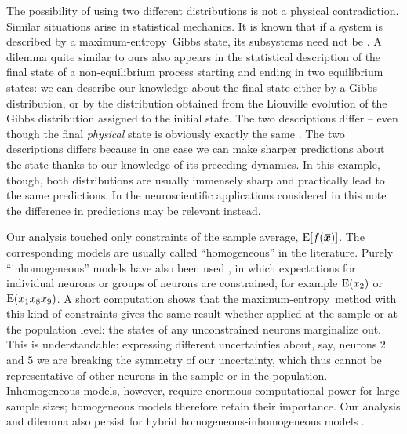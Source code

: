 \documentclass{article}
\theoremstyle{remark}
\theoremstyle{innote}
\newcommand*{\citep}{\parencites}
\renewcommand*{\cite}{\citep}
\renewcommand*{\|}{\mathpunct{|}}%
\DeclarePairedDelimiter\clcl{[}{]}
\newcommand*{\sect}{\S}%
\newcommand*{\E}{\mathrm{E}}
\DeclarePairedDelimiter\expp{(}{)}
\newcommand*{\expe}{\E\expp}%
\newcommand*{\expeb}{\E\clcl}%
\theoremstyle{simple}
\newcommand*{\puzzle}{{\fontencoding{U}\fontfamily{fontawesometwo}\selectfont\symbol{225}}}
\newcommand{\mynote}[1]{ {\color{notecolour}\puzzle\ #1}}
\newcommand*{\widebar}[1]{{\mkern1.5mu\skew{2}\overline{\mkern-1.5mu#1\mkern-1.5mu}\mkern 1.5mu}}
\newcommand*{\sav}{\widebar} %
\newcommand*{\yxx}{x}%
\newcommand*{\yx}{\bm{\yxx}}%
\newcommand*{\yxs}{\sav{\yx}}%
\newcommand*{\me}{maximum-entropy}
\begin{document}
The possibility of using two different distributions is not a physical
contradiction. Similar situations arise in statistical mechanics. It is
known that if a system is described by a \me\ Gibbs state, its subsystems
need not be \cite{maesetal1999}. A dilemma quite similar to ours also
appears in the statistical description of the final state of a
non-equilibrium process starting and ending in two equilibrium states: we
can describe our knowledge about the final state either by a Gibbs
distribution, or by the distribution obtained from the Liouville evolution
of the Gibbs distribution assigned to the initial state. The two
descriptions differ -- even though the final \emph{physical} state is
obviously exactly the same \cite[\sect~4]{jaynes1985d_r1993}. The two
descriptions differs because in one case we can make sharper predictions
about the state thanks to our knowledge of its preceding dynamics. In this
example, though, both distributions are usually immensely sharp and
practically lead to the same predictions. In the neuroscientific
applications considered in this note the difference in predictions may be
relevant instead.

Our analysis touched only constraints of the sample average,
$\expeb{f(\yxs)}$. The corresponding models are usually called
\enquote{homogeneous} in the literature. Purely \enquote{inhomogeneous}
models have also been used
\cite{schneidmanetal2006,shlensetal2006,roudietal2009b}, in which
expectations for individual neurons or groups of neurons are constrained,
for example $\expe{x_2}$ or $\expe{x_1x_8x_9}$. A short computation shows
that the \me\ method with this kind of constraints gives the same result
whether applied at the sample or at the population level: the states of any
unconstrained neurons marginalize out. This is understandable: expressing
different uncertainties about, say, neurons $2$ and $5$ we are breaking the
symmetry of our uncertainty, which thus cannot be representative of other
neurons in the sample or in the population. Inhomogeneous models, however,
require enormous computational power for large sample sizes; homogeneous
models therefore retain their importance. Our analysis and dilemma also
persist for hybrid homogeneous-inhomogeneous models
\cite{tkaciketal2014b,shimazakietal2015}.



\end{document}
